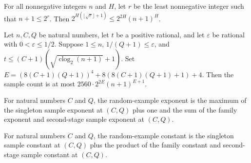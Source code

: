 \begin{theorem}
\label{FABL.two_pow_mul_sqrt_clog_add_one_le_fixed_power}
\leanok
{}
For all nonnegative integers $n$ and $H$, let $r$ be the least nonnegative integer such
that $n+1\le 2^r$. Then $2^{H(\lfloor\sqrt r\rfloor+1)}\le 2^{2H}(n+1)^H$.
\end{theorem}

\begin{theorem}
\label{FABL.singletonInfluenceSampleCount_le_fixed_power}
\leanok
{}
Let $n,C,Q$ be natural numbers, let $t$ be a positive rational, and let $\varepsilon$ be
rational with $0<\varepsilon\le 1/2$. Suppose $1\le n$, $1/(Q+1)\le\varepsilon$, and
$t\le(C+1)(\sqrt{\operatorname{clog}_2(n+1)}+1)$. Set
$E=(8(C+1)(Q+1))^4+8(8(C+1)(Q+1)+1)+4$. Then the sample count is at most $2560\cdot
2^{2E}(n+1)^{E+1}$.
\end{theorem}

\begin{definition}
\label{FABL.learningConsequencesRandomExampleExponent}
\leanok
{}
For natural numbers $C$ and $Q$, the random-example exponent is the maximum of the
singleton sample exponent at $(C,Q)$ plus one and the sum of the family exponent and
second-stage sample exponent at $(C,Q)$.
\end{definition}

\begin{definition}
\label{FABL.learningConsequencesRandomExampleConstant}
\leanok
{}
For natural numbers $C$ and $Q$, the random-example constant is the singleton sample
constant at $(C,Q)$ plus the product of the family constant and second-stage sample
constant at $(C,Q)$.
\end{definition}

